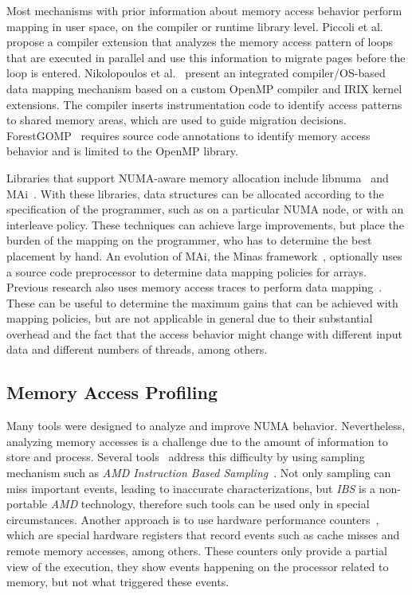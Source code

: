 Most mechanisms with prior information about memory access behavior perform mapping in user space, on the compiler or runtime library level.
Piccoli et al.~\cite{Piccoli2014} propose a compiler extension that analyzes the memory access pattern of loops that are executed in parallel and use this information to migrate pages before the loop is entered.
Nikolopoulos et al.~\cite{Nikolopoulos2000a,Nikolopoulos2000} present an integrated compiler/OS-based data mapping mechanism based on a custom OpenMP compiler and IRIX kernel extensions. The compiler inserts instrumentation code to identify access patterns to shared memory areas, which are used to guide migration decisions.
ForestGOMP~\cite{Broquedis2010a} requires source code annotations to identify memory access behavior and is limited to the OpenMP library.

Libraries that support NUMA-aware memory allocation include libnuma~\cite{Kleen2004} and MAi~\cite{Ribeiro2009}. With these libraries, data structures can be allocated according to the specification of the programmer, such as on a particular NUMA node, or with an interleave policy. These techniques can achieve large improvements, but place the burden of the mapping on the programmer, who has to determine the best placement by hand. An evolution of MAi, the Minas framework~\cite{Ribeiro2010}, optionally uses a source code preprocessor to determine data mapping policies for arrays. Previous research also uses memory access traces to perform data mapping~\cite{Diener2015,Marathe2010,Bolosky1992}. These can be useful to determine the maximum gains that can be achieved with mapping policies, but are not applicable in general due to their substantial overhead and the fact that the access behavior might change with different input data and different numbers of threads, among others.


\subsection{Memory Access Profiling}
\label{sec:soa-profiling}

Many tools were designed to analyze and improve NUMA behavior. Nevertheless, analyzing
memory accesses is a challenge due to the amount of information to store and process.
Several tools~\cite{Lachaize12MemProf,McCurdy2010}  address this difficulty by
using sampling mechanism such as \emph{AMD  Instruction Based
Sampling}~\cite{Drongowski07Instructionbased}. Not only sampling can miss important events, leading to inaccurate characterizations, but \emph{IBS} is a non-portable \emph{AMD}
technology, therefore such tools can be used only in special circumstances. Another approach is to
use hardware performance counters~\cite{Majo13(Mis)understanding,
Jiang14Understanding,Bosch00Rivet,Weyers14Visualization,Tao01Visualizing},
which are special hardware registers that record events such as cache
misses and remote memory accesses, among others. These counters only provide a partial view
of the execution, they show events happening on the processor related to
memory, but not what triggered these events.

